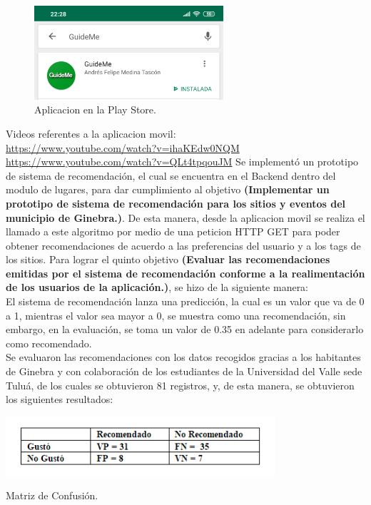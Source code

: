\documentclass[12pt,letterpaper,openany]{book}
\begin{document}
\begin{figure}[H]
\begin{center}
\includegraphics[width=7cm]{./imagenes/gm}
\caption{Aplicacion en la Play Store.}
\end{center}
\end{figure}
Videos referentes a la aplicacion movil: \\
\url{https://www.youtube.com/watch?v=ihaKEdw0NQM}\\
\url{https://www.youtube.com/watch?v=QLt4tpqouJM}
\vspace{5mm}\newline
Se implementó un prototipo de sistema de recomendación, el cual se encuentra en el Backend dentro del modulo de lugares, para dar cumplimiento al objetivo \textbf{(Implementar un prototipo de sistema de recomendación para los sitios y eventos del municipio de Ginebra.)}. De esta manera, desde la aplicacion movil se realiza el llamado a este algoritmo por medio de una peticion HTTP GET para poder obtener recomendaciones de acuerdo a las preferencias del usuario y a los tags de los sitios.
\vspace{5mm}\newline
Para lograr el quinto objetivo \textbf{(Evaluar las recomendaciones emitidas por el sistema de recomendación conforme a la realimentación de los usuarios de la aplicación.)}, se hizo de la siguiente manera:\\
El sistema de recomendación lanza una predicción, la cual es un valor que va de 0 a 1, mientras el valor sea mayor a 0, se muestra como una recomendación, sin embargo, en la evaluación, se toma un valor de 0.35 en adelante para considerarlo como recomendado. \\
Se evaluaron las recomendaciones con  los datos recogidos gracias a los habitantes de Ginebra y con colaboración de los estudiantes de la Universidad del Valle sede Tuluá, de los cuales se obtuvieron 81 registros, y, de esta manera, se obtuvieron los siguientes resultados:
\begin{table}[H]
\centering
\includegraphics[width=10cm]{./imagenes/PrecisionRecall}
\caption{Matriz de Confusión.}
\end{table}
\end{document}
